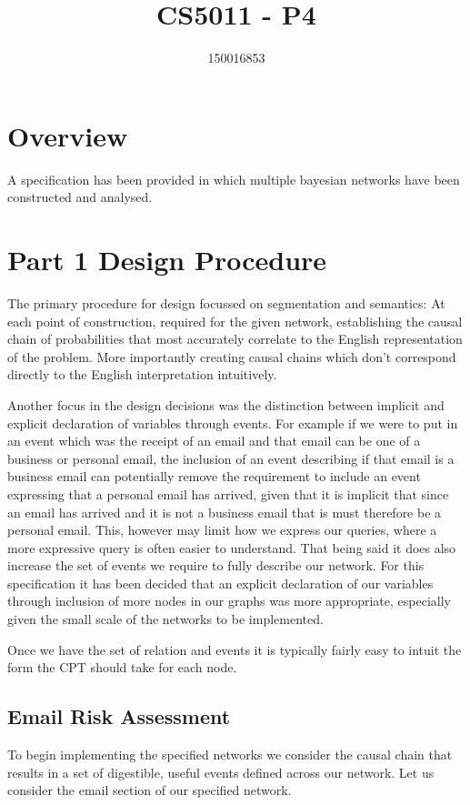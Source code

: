 \documentclass[10pt,a4paper]{article}
\author{150016853}
\title{CS5011 - P4}
\begin{document}
\maketitle

\section{Overview}

A specification has been provided in which multiple bayesian networks have been constructed and analysed. 


\section{Part 1 Design Procedure}

The primary procedure for design focussed on segmentation and semantics: At each point of construction, required for the given network,  establishing the causal chain of probabilities that most accurately correlate to the English representation of the problem. More importantly creating causal chains which don't correspond directly to the English interpretation intuitively. 

Another focus in the design decisions was the distinction between implicit and explicit declaration of variables through events. For example if we were to put in an event which was the receipt of an email and that email can be one of a business or personal email, the inclusion of an event describing if that email is a business email can potentially remove the requirement to include an event expressing that a personal email has arrived, given that it is implicit that since an email has arrived and it is not a business email that is must therefore be a personal email. This, however may limit how we express our queries, where a more expressive query is often easier to understand. That being said it does also increase the set of events we require to fully describe our network. For this specification it has been decided that an explicit declaration of our variables through inclusion of more nodes in our graphs was more appropriate, especially given the small scale of the networks to be implemented.

Once we have the set of relation and events it is typically fairly easy to intuit the form the CPT should take for each node.

\subsection{Email Risk Assessment}
To begin implementing the specified networks we consider the causal chain that results in a set of digestible, useful events defined across our network. Let us consider the email section of our specified network. 
\end{document}

